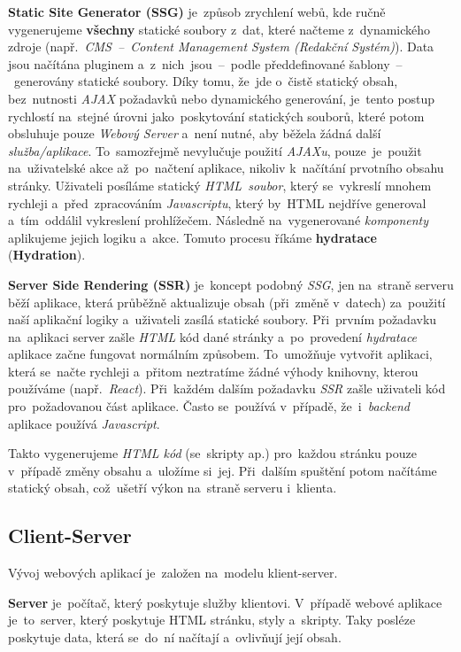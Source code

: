 \documentclass[10pt,a4paper]{article}
\begin{document}
\textbf{Static Site Generator (SSG)} je~způsob zrychlení webů, kde ručně vygenerujeme \textbf{všechny} statické soubory z~dat, které načteme z~dynamického zdroje (např.~\emph{CMS~--~Content Management System (Redakční Systém)}). Data jsou načítána pluginem a~z~nich~jsou~--~podle předdefinované šablony~--~generovány statické soubory. Díky tomu, že~jde o~čistě statický obsah, bez~nutnosti \emph{AJAX} požadavků nebo dynamického generování, je~tento postup rychlostí na~stejné úrovni jako~poskytování statických souborů, které potom obsluhuje pouze \emph{Webový Server} a~není nutné, aby běžela žádná další \emph{služba/aplikace}. To~samozřejmě nevylučuje použití \emph{AJAXu}, pouze~je~použit na~uživatelské akce až~po~načtení aplikace, nikoliv k~načítání prvotního obsahu stránky. Uživateli posíláme statický \emph{HTML~soubor}, který se~vykreslí mnohem rychleji a~před~zpracováním \emph{Javascriptu}, který by~HTML nejdříve generoval a~tím~oddálil vykreslení prohlížečem. Následně na~vygenerované \emph{komponenty} aplikujeme jejich logiku a~akce. Tomuto procesu říkáme \textbf{hydratace} (\textbf{Hydration}).

\textbf{Server Side Rendering (SSR)} je~koncept podobný \emph{SSG}, jen na~straně serveru běží aplikace, která průběžně aktualizuje obsah (při~změně v~datech) za~použití naší aplikační logiky a~uživateli zasílá statické soubory. Při~prvním požadavku na~aplikaci server zašle \emph{HTML} kód dané stránky a~po~provedení \emph{hydratace} aplikace začne fungovat normálním způsobem. To~umožňuje vytvořit aplikaci, která se~načte rychleji a~přitom neztratíme žádné výhody knihovny, kterou používáme (např.~\emph{React}). Při~každém dalším požadavku \emph{SSR} zašle uživateli kód pro~požadovanou část aplikace. Často se~používá v~případě, že~i~\emph{backend} aplikace používá \emph{Javascript}. \cite{uc:ssrandssg}

Takto vygenerujeme \emph{HTML kód} (se~skripty ap.) pro~každou stránku pouze v~případě změny obsahu a~uložíme si~jej. Při~dalším spuštění potom načítáme statický obsah, což~ušetří výkon na~straně serveru i~klienta.

\subsection{Client-Server}
    Vývoj webových aplikací je~založen na~modelu klient-server.

    \textbf{Server} je~počítač, který poskytuje služby klientovi. V~případě webové aplikace je~to~server, který poskytuje HTML stránku, styly a~skripty.
    Taky posléze poskytuje data, která se~do~ní načítají a~ovlivňují její obsah.
\end{document}
